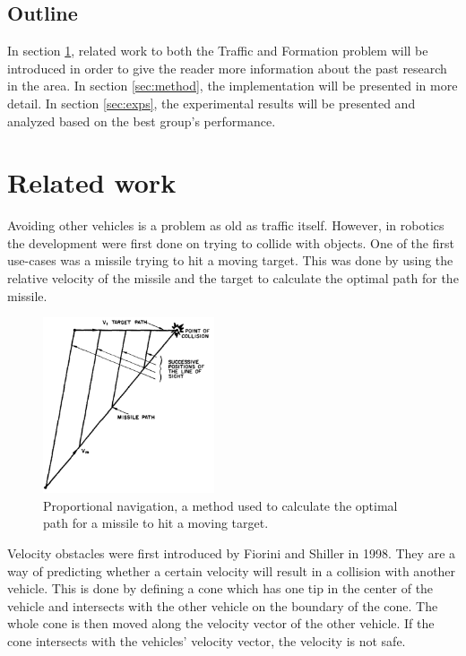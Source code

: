 \documentclass[a4paper,12pt]{article}
\begin{document}
\begin{multicols}{2}
\subsection{Outline}
In section \ref{sec:relwork}, related work to both the Traffic and Formation problem will be introduced in order to give the reader more information about the past research in the area. In section \ref{sec:method}, the implementation will be presented in more detail. In section \ref{sec:exps}, the experimental results will be presented and analyzed based on the best group's performance.

\section{Related work}
\label{sec:relwork}

Avoiding other vehicles is a problem as old as traffic itself. However, in robotics the development were first done on trying to collide with objects. One of the first use-cases was a missile trying to hit a moving target. This was done by using the relative velocity of the missile and the target to calculate the optimal path for the missile. \cite{adler1956missile}

\begin{figure}[H]
  \centering
  \includegraphics[width=0.45\textwidth]{missile.png}
  \caption{Proportional navigation, a method used to calculate the optimal path for a missile to hit a moving target. \cite{adler1956missile}}
  \label{fig:missile}
\end{figure}

Velocity obstacles were first introduced by Fiorini and Shiller in 1998. They are a way of predicting whether a certain velocity will result in a collision with another vehicle. This is done by defining a cone which has one tip in the center of the vehicle and intersects with the other vehicle on the boundary of the cone. The whole cone is then moved along the velocity vector of the other vehicle. If the cone intersects with the vehicles' velocity vector, the velocity is not safe. \cite{doi:10.1177/027836499801700706}


\end{multicols}
\end{document}
